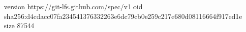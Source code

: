 version https://git-lfs.github.com/spec/v1
oid sha256:d4cdacc07fa234541376332263e6dc79cb0e259c217e680d08116664f917ed1e
size 87544
